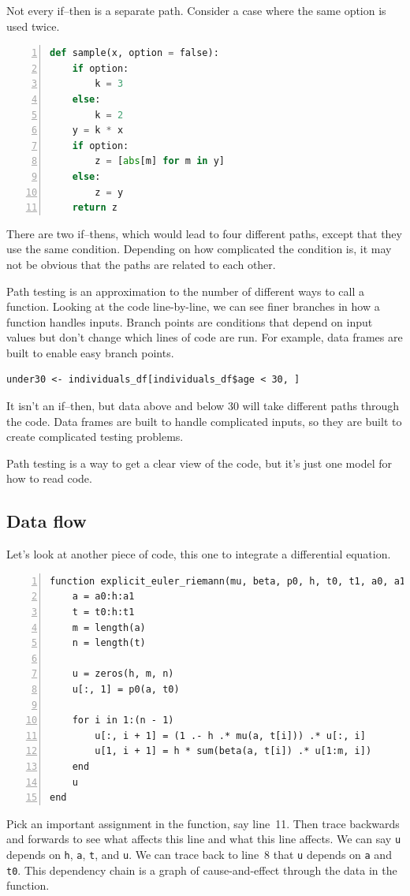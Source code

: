 \documentclass[fleqn,10pt]{olplainarticle}
\begin{document}
Not every if--then is a separate path. Consider a case where
the same option is used twice.

\begin{lstlisting}[language=Python,numbers=left]
def sample(x, option = false):
    if option:
        k = 3
    else:
        k = 2
    y = k * x
    if option:
        z = [abs[m] for m in y]
    else:
        z = y
    return z
\end{lstlisting}

\noindent{}There are two if--thens, which would lead to four different
paths, except that they use the same condition. Depending on
how complicated the condition is, it may not be obvious that
the paths are related to each other.

Path testing is an approximation to the number of different
ways to call a function. Looking at the code line-by-line,
we can see finer branches in how a function handles inputs.
Branch points are conditions that depend on input values
but don't change which lines of code are run. For example,
data frames are built to enable easy branch points.
\begin{lstlisting}
under30 <- individuals_df[individuals_df$age < 30, ]
\end{lstlisting}
It isn't an if--then, but data above and below 30 will take
different paths through the code. Data frames are built
to handle complicated inputs, so they are built to create
complicated testing problems.

Path testing is a way to get a clear view of
the code, but it's just one model for how to read code.

\subsection{Data flow}
Let's look at another piece of code, this one to integrate
a differential equation.
\begin{lstlisting}[numbers=left]
function explicit_euler_riemann(mu, beta, p0, h, t0, t1, a0, a1)
    a = a0:h:a1
    t = t0:h:t1
    m = length(a)
    n = length(t)

    u = zeros(h, m, n)
    u[:, 1] = p0(a, t0)

    for i in 1:(n - 1)
        u[:, i + 1] = (1 .- h .* mu(a, t[i])) .* u[:, i]
        u[1, i + 1] = h * sum(beta(a, t[i]) .* u[1:m, i])
    end
    u
end
\end{lstlisting}

Pick an important assignment in the function, say line~11.
Then trace backwards and forwards to see what affects this line
and what this line affects. We can say \lstinline|u| depends
on \lstinline|h|, \lstinline|a|, \lstinline|t|, and \lstinline|u|.
We can trace back to line~8 that \lstinline|u| depends on
\lstinline|a| and \lstinline|t0|. This dependency chain is a
graph of cause-and-effect through the data in the function.
\end{document}
